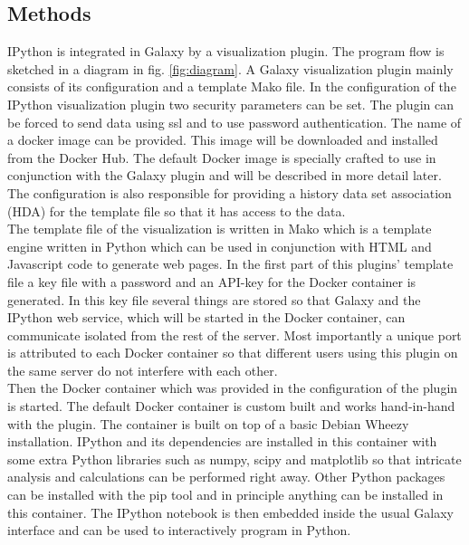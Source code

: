 \documentclass{bioinfo}
\begin{document}
\begin{methods}
\section{Methods}

IPython is integrated in Galaxy by a visualization plugin. The program flow is sketched in a diagram in fig. \ref{fig:diagram}. A Galaxy visualization plugin mainly consists of its configuration and a template Mako file. In the configuration of the IPython visualization plugin two security parameters can be set. The plugin can be forced to send data using ssl and to use password authentication. The name of a docker image can be provided. This image will be downloaded and installed from the Docker Hub. The default Docker image is specially crafted to use in conjunction with the Galaxy plugin and will be described in more detail later. The configuration is also responsible for providing a history data set association (HDA) for the template file so that it has access to the data. \\
The template file of the visualization is written in Mako which is a template engine written in Python which can be used in conjunction with HTML and Javascript code to generate web pages. In the first part of this plugins' template file a key file with a password and an API-key for the Docker container is generated. In this key file several things are stored so that Galaxy and the IPython web service, which will be started in the Docker container, can communicate isolated from the rest of the server. Most importantly a unique port is attributed to each Docker container so that different users using this plugin on the same server do not interfere with each other. \\
Then the Docker container which was provided in the configuration of the plugin is started. The default Docker container is custom built and works hand-in-hand with the plugin. The container 
is built on top of a basic Debian Wheezy installation. IPython and its dependencies are installed in this container with some extra Python libraries such as numpy, scipy and matplotlib so that intricate analysis and calculations can be performed right away. Other Python packages can be installed with the pip tool and in principle anything can be installed in this container. The IPython notebook is then embedded inside the usual Galaxy interface and can be used to interactively program in Python.\\

\end{methods}
\end{document}
